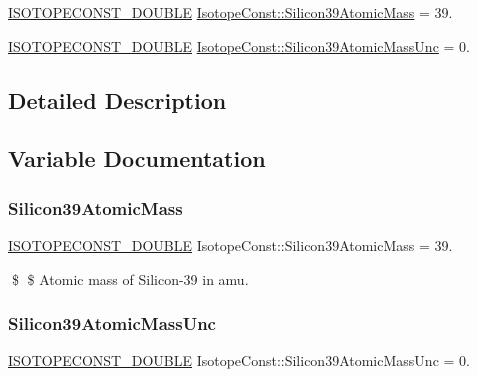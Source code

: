 \begin{DoxyCompactItemize}
\item 
\mbox{\hyperlink{group___isotope_const-_macros_ga8f45a7272ce02c0b4c65c44636ed719a}{I\+S\+O\+T\+O\+P\+E\+C\+O\+N\+S\+T\+\_\+\+D\+O\+U\+B\+LE}} \mbox{\hyperlink{group___isotope_const-_silicon-_si39_gaa65b7ecc6accce17529f87c9a0dd03aa}{Isotope\+Const\+::\+Silicon39\+Atomic\+Mass}} = 39.
\item 
\mbox{\hyperlink{group___isotope_const-_macros_ga8f45a7272ce02c0b4c65c44636ed719a}{I\+S\+O\+T\+O\+P\+E\+C\+O\+N\+S\+T\+\_\+\+D\+O\+U\+B\+LE}} \mbox{\hyperlink{group___isotope_const-_silicon-_si39_ga2b383a107503ad44bc423c99b6a80b4c}{Isotope\+Const\+::\+Silicon39\+Atomic\+Mass\+Unc}} = 0.
\end{DoxyCompactItemize}


\subsection{Detailed Description}


\subsection{Variable Documentation}
\mbox{\label{group___isotope_const-_silicon-_si39_gaa65b7ecc6accce17529f87c9a0dd03aa}} 
\subsubsection{\texorpdfstring{Silicon39\+Atomic\+Mass}{Silicon39AtomicMass}}
{\footnotesize\ttfamily \mbox{\hyperlink{group___isotope_const-_macros_ga8f45a7272ce02c0b4c65c44636ed719a}{I\+S\+O\+T\+O\+P\+E\+C\+O\+N\+S\+T\+\_\+\+D\+O\+U\+B\+LE}} Isotope\+Const\+::\+Silicon39\+Atomic\+Mass = 39.}

\$ \$ Atomic mass of Silicon-\/39 in amu. \mbox{\label{group___isotope_const-_silicon-_si39_ga2b383a107503ad44bc423c99b6a80b4c}} 
\subsubsection{\texorpdfstring{Silicon39\+Atomic\+Mass\+Unc}{Silicon39AtomicMassUnc}}
{\footnotesize\ttfamily \mbox{\hyperlink{group___isotope_const-_macros_ga8f45a7272ce02c0b4c65c44636ed719a}{I\+S\+O\+T\+O\+P\+E\+C\+O\+N\+S\+T\+\_\+\+D\+O\+U\+B\+LE}} Isotope\+Const\+::\+Silicon39\+Atomic\+Mass\+Unc = 0.}

